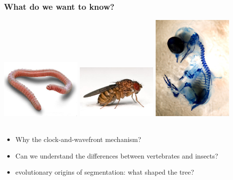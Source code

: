 \documentclass[compress]{beamer}
\begin{document}
\begin{frame}
    \frametitle{What do we want to know?}
    \begin{center}
    \includegraphics[width=0.3\textwidth]{figures/annelid_SEM.jpg}
    \includegraphics[width=0.3\textwidth]{figures/drosophila.jpg}
    \includegraphics[width=0.3\textwidth]{figures/chick_vertebrae.jpg}
    \\~\\
    \end{center}
    
    \begin{itemize}
    \item Why the clock-and-wavefront mechanism?
    \item Can we understand the differences between vertebrates and insects?
    \item evolutionary origins of segmentation: what shaped the tree? %
    \end{itemize}

\end{frame}
\end{document}
